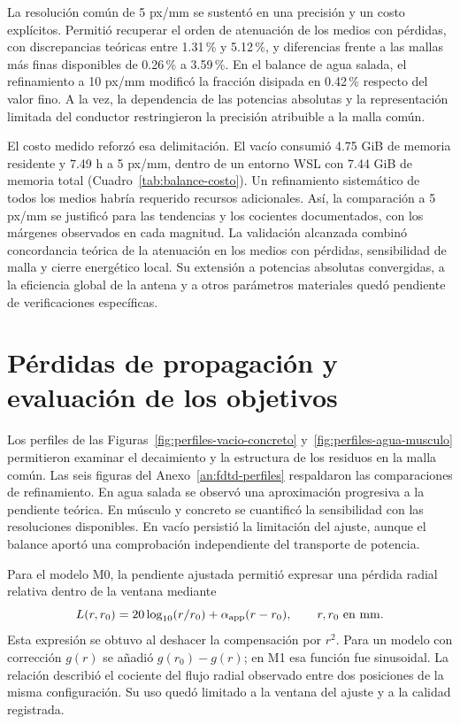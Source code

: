 La resolución común de 5 px/mm se sustentó en una precisión y un costo explícitos. Permitió recuperar el orden de atenuación de los medios con pérdidas, con discrepancias teóricas entre 1.31\,\% y 5.12\,\%, y diferencias frente a las mallas más finas disponibles de 0.26\,\% a 3.59\,\%. En el balance de agua salada, el refinamiento a 10 px/mm modificó la fracción disipada en 0.42\,\% respecto del valor fino. A la vez, la dependencia de las potencias absolutas y la representación limitada del conductor restringieron la precisión atribuible a la malla común.

El costo medido reforzó esa delimitación. El vacío consumió 4.75 GiB de memoria residente y 7.49 h a 5 px/mm, dentro de un entorno WSL con 7.44 GiB de memoria total (Cuadro~\ref{tab:balance-costo}). Un refinamiento sistemático de todos los medios habría requerido recursos adicionales. Así, la comparación a 5 px/mm se justificó para las tendencias y los cocientes documentados, con los márgenes observados en cada magnitud. La validación alcanzada combinó concordancia teórica de la atenuación en los medios con pérdidas, sensibilidad de malla y cierre energético local. Su extensión a potencias absolutas convergidas, a la eficiencia global de la antena y a otros parámetros materiales quedó pendiente de verificaciones específicas.

\section{Pérdidas de propagación y evaluación de los objetivos}
Los perfiles de las Figuras~\ref{fig:perfiles-vacio-concreto} y~\ref{fig:perfiles-agua-musculo} permitieron examinar el decaimiento y la estructura de los residuos en la malla común. Las seis figuras del Anexo~\ref{an:fdtd-perfiles} respaldaron las comparaciones de refinamiento. En agua salada se observó una aproximación progresiva a la pendiente teórica. En músculo y concreto se cuantificó la sensibilidad con las resoluciones disponibles. En vacío persistió la limitación del ajuste, aunque el balance aportó una comprobación independiente del transporte de potencia.

Para el modelo M0, la pendiente ajustada permitió expresar una pérdida radial relativa dentro de la ventana mediante
\begin{equation}
 L(r,r_0)=20\log_{10}(r/r_0)+\alpha_{\rm app}(r-r_0),\qquad r,r_0\text{ en mm}.
\label{eq:perdida-relativa-modelo}
\end{equation}
Esta expresión se obtuvo al deshacer la compensación por $r^2$. Para un modelo con corrección $g(r)$ se añadió $g(r_0)-g(r)$; en M1 esa función fue sinusoidal. La relación describió el cociente del flujo radial observado entre dos posiciones de la misma configuración. Su uso quedó limitado a la ventana del ajuste y a la calidad registrada.

